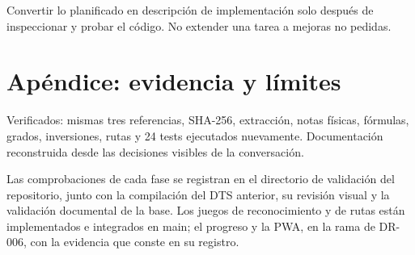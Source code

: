 \documentclass[a4paper,11pt]{article}
\begin{document}
Convertir lo planificado en descripción de implementación solo después
de inspeccionar y probar el código. No extender una tarea a mejoras no
pedidas.

\Needspace{4cm}
\section{Apéndice: evidencia y
límites}\label{apuxe9ndice-evidencia-y-luxedmites}

Verificados: mismas tres referencias, SHA-256, extracción, notas
físicas, fórmulas, grados, inversiones, rutas y 24 tests ejecutados
nuevamente. Documentación reconstruida desde las decisiones visibles de
la conversación.

Las comprobaciones de cada fase se registran en el directorio de
validación del repositorio, junto con la compilación del DTS anterior,
su revisión visual y la validación documental de la base. Los juegos de
reconocimiento y de rutas están implementados e integrados en main; el
progreso y la PWA, en la rama de DR-006, con la evidencia que conste en
su registro.
\end{document}
